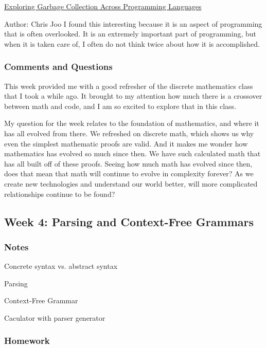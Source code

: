 \documentclass{article}
\theoremstyle{theorem}
\theoremstyle{definition}
\theoremstyle{remark}
\begin{document}
\href{https://github.com/cjoo03/HW3/blob/main/README.md}{Exploring Garbage Collection Across Programming Languages}

Author: Chris Joo
I found this interesting because it is an aspect of programming that is often overlooked.
It is an extremely important part of programming, but when it is taken care of, I often
do not think twice about how it is accomplished. 


\subsubsection*{Comments and Questions}

This week provided me with a good refresher of the discrete mathematics class that I took a while ago. It brought to my attention how much
there is a crossover between math and code, and I am so excited to explore that in this class.

My question for the week relates to the foundation of mathematics, and where it has all evolved from there. We refreshed on discrete math,
which shows us why even the simplest mathematic proofs are valid. And it makes me wonder how mathematics has evolved so much since then. We have
such calculated math that has all built off of these proofs. Seeing how much math has evolved since then, does that mean that math will continue to
evolve in complexity forever? As we create new technologies and understand our world better, will more complicated relationships continue to be found?


\subsection{Week 4: Parsing and Context-Free Grammars}
\subsubsection*{Notes}
Concrete syntax vs. abstract syntax

Parsing

Context-Free Grammar

Caculator with parser generator
\subsubsection*{Homework}
\end{document}
